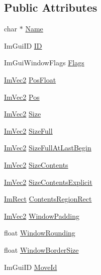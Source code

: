 \subsection*{Public Attributes}
\begin{DoxyCompactItemize}
\item 
char $\ast$ \hyperlink{struct_im_gui_window_ab44252eb7d02d3f38249f5bac605037c}{Name}
\item 
Im\+Gui\+ID \hyperlink{struct_im_gui_window_a5976b8d78bcc543ad7f23561f5cf0b8f}{ID}
\item 
Im\+Gui\+Window\+Flags \hyperlink{struct_im_gui_window_a7c29e810a533b9a647cce5d93d45057f}{Flags}
\item 
\hyperlink{struct_im_vec2}{Im\+Vec2} \hyperlink{struct_im_gui_window_a84170962470c8078195dad980cdfc1c0}{Pos\+Float}
\item 
\hyperlink{struct_im_vec2}{Im\+Vec2} \hyperlink{struct_im_gui_window_a1453f685401a44f76256fb54a4aac451}{Pos}
\item 
\hyperlink{struct_im_vec2}{Im\+Vec2} \hyperlink{struct_im_gui_window_a876e7aaf4cd824c8956238fba61387d5}{Size}
\item 
\hyperlink{struct_im_vec2}{Im\+Vec2} \hyperlink{struct_im_gui_window_ac3c7eb6b9cd556d56210cbb37caf0c74}{Size\+Full}
\item 
\hyperlink{struct_im_vec2}{Im\+Vec2} \hyperlink{struct_im_gui_window_a284ebffabfd60b81f363173be770cff0}{Size\+Full\+At\+Last\+Begin}
\item 
\hyperlink{struct_im_vec2}{Im\+Vec2} \hyperlink{struct_im_gui_window_a71097695729bf257ccaea824caf306a0}{Size\+Contents}
\item 
\hyperlink{struct_im_vec2}{Im\+Vec2} \hyperlink{struct_im_gui_window_a329d19a8805352b3a116e75e217d2155}{Size\+Contents\+Explicit}
\item 
\hyperlink{struct_im_rect}{Im\+Rect} \hyperlink{struct_im_gui_window_ac0d04b743eab132900c1ededc8eab9f6}{Contents\+Region\+Rect}
\item 
\hyperlink{struct_im_vec2}{Im\+Vec2} \hyperlink{struct_im_gui_window_a538d3d70ad8f71a4ec58a6a0560b2f02}{Window\+Padding}
\item 
float \hyperlink{struct_im_gui_window_a871ebbbfdf354600a3833c270d6e6ef4}{Window\+Rounding}
\item 
float \hyperlink{struct_im_gui_window_ad51248766b9a815ce20b0d11e13b42b0}{Window\+Border\+Size}
\item 
Im\+Gui\+ID \hyperlink{struct_im_gui_window_a680ac2168da85f59c35de8f0813224d6}{Move\+Id}
\item 

\end{DoxyCompactItemize}
